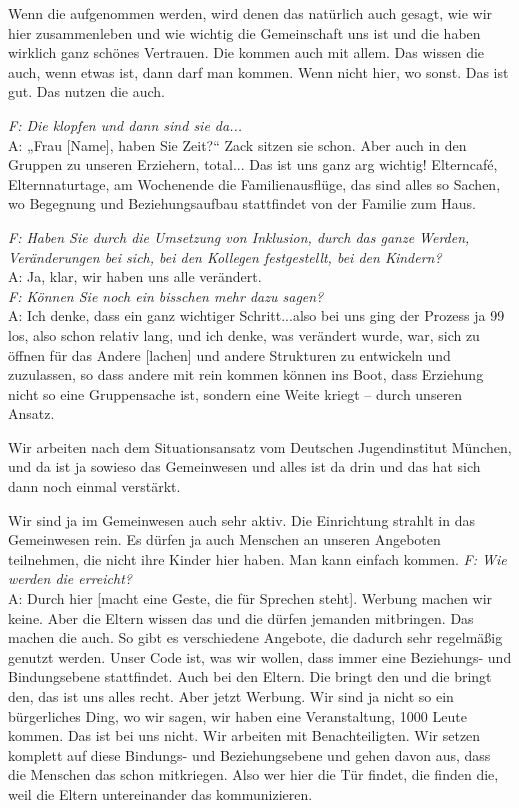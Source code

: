 \begin{linenumbers*}
Wenn die aufgenommen werden, wird denen das natürlich auch gesagt, wie wir hier zusammenleben und wie wichtig die Gemeinschaft uns ist und die haben wirklich ganz schönes Vertrauen. Die kommen auch mit allem. Das wissen die auch, wenn etwas ist, dann darf man kommen. Wenn nicht hier, wo sonst. Das ist gut. Das nutzen die auch. 

\emph{F: Die klopfen und dann sind sie da...}\\
A: „Frau {[Name]}, haben Sie Zeit?“ Zack sitzen sie schon. Aber auch in den Gruppen zu unseren Erziehern, total... Das ist uns ganz arg wichtig!
Elterncafé, Elternnaturtage, am Wochenende die Familienausflüge, das sind alles so Sachen, wo Begegnung und Beziehungsaufbau stattfindet von der Familie zum Haus. 
 
\emph{F: Haben Sie durch die Umsetzung von Inklusion, durch das ganze Werden, Veränderungen bei sich, bei den Kollegen festgestellt, bei den Kindern?}\\
A: Ja, klar, wir haben uns alle verändert.\\ 
\emph{F: Können Sie noch ein bisschen mehr dazu sagen?}\\
A: Ich denke, dass ein ganz wichtiger Schritt...also bei uns ging der Prozess ja
99 los, also schon relativ lang, und ich denke, was verändert wurde, war, sich
zu öffnen für das Andere {[lachen]} und andere Strukturen zu entwickeln und zuzulassen, so dass andere mit rein kommen können ins Boot, dass Erziehung nicht so eine Gruppensache ist, sondern eine Weite kriegt -- durch unseren Ansatz. 

Wir arbeiten nach dem Situationsansatz vom Deutschen Jugendinstitut München, und da ist ja sowieso das Gemeinwesen und alles ist da drin und das hat sich dann noch einmal verstärkt. 

Wir sind ja im Gemeinwesen auch sehr aktiv. Die Einrichtung strahlt in das Gemeinwesen rein. Es dürfen ja auch Menschen an unseren Angeboten teilnehmen, die nicht ihre Kinder hier haben. Man kann einfach kommen.
\emph{F: Wie werden die erreicht?}\\
A: Durch hier {[macht eine Geste, die für Sprechen steht]}. Werbung machen wir keine. Aber die Eltern wissen das und die dürfen jemanden mitbringen. Das machen die auch. So gibt es verschiedene Angebote, die dadurch sehr regelmäßig genutzt werden. Unser Code ist, was wir wollen, dass immer eine Beziehungs- und Bindungsebene stattfindet. Auch bei den Eltern. Die bringt den und die bringt den, das ist uns alles recht. Aber jetzt Werbung. Wir sind ja nicht so ein bürgerliches Ding, wo wir sagen, wir haben eine Veranstaltung, 1000 Leute kommen. Das ist bei uns nicht. Wir arbeiten mit Benachteiligten. Wir setzen komplett auf diese Bindungs- und Beziehungsebene und gehen davon aus, dass die Menschen das schon mitkriegen. Also wer hier die Tür findet, die finden die, weil die Eltern untereinander das kommunizieren. 


\end{linenumbers*}

